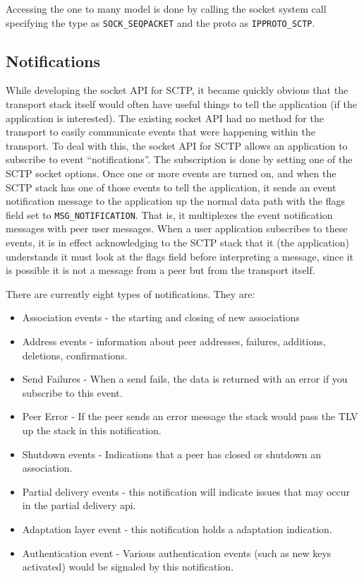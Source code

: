 \documentclass[conference]{IEEEtran}
\begin{document}
Accessing the one to many model is done by calling the socket system call specifying the type as
\texttt{SOCK\_SEQPACKET} and the proto as \texttt{IPPROTO\_SCTP}.

\subsection{Notifications}

While developing the socket API for SCTP, it became quickly obvious
that the transport stack itself would often have useful things to tell the application 
(if the application is interested). The existing socket API had no method
for the transport to easily communicate events that were happening
within the transport. To deal with this, the socket API for SCTP allows an
application to subscribe to event ``notifications''. The subscription is
done by setting one of the SCTP socket options. Once one or more events are
turned on, and when the SCTP stack has one of those events to tell the application,
it sends an event notification message to the application up the normal data 
path with the flags field set to \texttt{MSG\_NOTIFICATION}. That is, it multiplexes 
the event notification messages with peer user messages.  When a user application
subscribes to these events, it is in effect acknowledging to the SCTP stack that it
(the application) understands it must look at the flags field before interpreting
a message, since it is possible it is not a message from a peer but from the transport
itself.

There are currently eight types of notifications. They are:
\begin{itemize}
 \item  Association events - the starting and closing of new associations
 \item  Address events - information about peer addresses, failures, additions, deletions, confirmations.
 \item  Send Failures - When a send fails, the data is returned with an error if you subscribe to this event.
 \item  Peer Error - If the peer sends an error message the stack would pass the TLV up the stack in this notification.
 \item  Shutdown events - Indications that a peer has closed or shutdown an association.
 \item  Partial delivery events - this notification will indicate issues that may occur in the partial delivery api.
 \item  Adaptation layer event - this notification holds a adaptation indication.
 \item  Authentication event - Various authentication events (such as new keys activated) would be signaled by this notification.
 \end{itemize}
\end{document}
